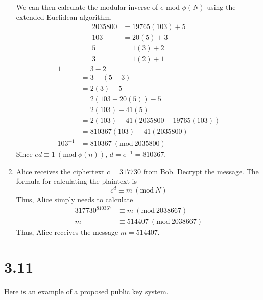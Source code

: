 \documentclass{article}
\newcommand{\Mod}[1]{\ (\mathrm{mod}\ #1)}
\begin{document}
\begin{enumerate}[label=(\alph*)]
          We can then calculate the modular inverse of \(e\) mod \(\phi(N)\) using the extended Euclidean algorithm.
          \begin{align*}
              2035800 & = 19765(103) + 5 \\
              103     & = 20(5) + 3      \\
              5       & = 1(3) + 2       \\
              3       & = 1(2) + 1
          \end{align*}
          \begin{align*}
              1        & = 3 - 2                             \\
                       & = 3 - (5 - 3)                       \\
                       & = 2(3) - 5                          \\
                       & = 2(103 - 20(5)) - 5                \\
                       & = 2(103) - 41(5)                    \\
                       & = 2(103) - 41(2035800 - 19765(103)) \\
                       & = 810367(103) - 41(2035800)         \\
              103^{-1} & = 810367 \Mod{2035800}
          \end{align*}
          Since \(ed \equiv 1 \Mod{\phi{(n)}}\), \(d = e^{-1} = 810367\).
    \item Alice receives the ciphertext \(c = 317730\) from Bob. Decrypt the message.
          The formula for calculating the plaintext is
          \begin{equation*}
              c^d \equiv m \Mod{N}
          \end{equation*}
          Thus, Alice simply needs to calculate
          \begin{align*}
              317730^{810367} & \equiv m \Mod{2038667}      \\
              m               & \equiv 514407 \Mod{2038667}
          \end{align*}
          Thus, Alice receives the message \(m = 514407\).
\end{enumerate}

\section*{3.11}
Here is an example of a proposed public key system.
\end{document}
